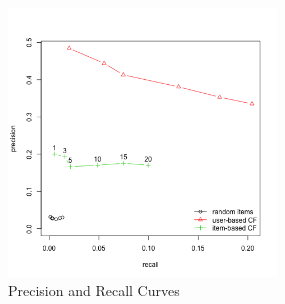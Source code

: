 \documentclass[conference]{IEEEtran}
\begin{document}
\begin{figure}
	\centering
	\includegraphics[width=2.8in]{precision_recall.png}
	\caption{Precision and Recall Curves}
	\label{fig:side:a}
\end{figure}
%
%

\end{document}
